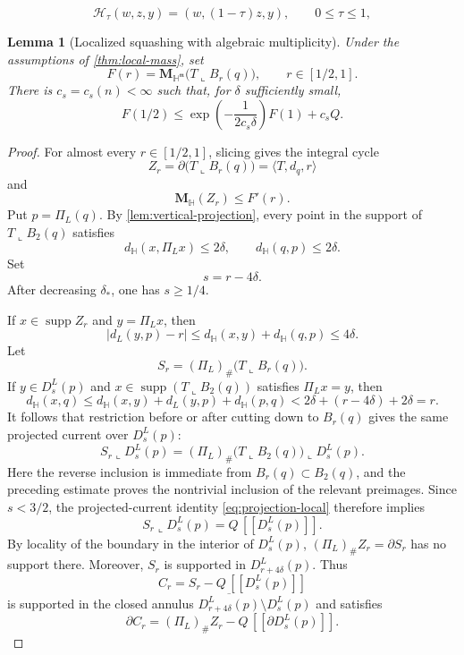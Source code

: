 \documentclass[10pt,a4paper]{amsart}
\newtheorem{lemma}{Lemma}
\newcommand{\Hyp}{\mathbb H}
\newcommand{\Mass}{\mathbf M}
\newcommand{\cur}[1]{\left[\!\left[#1\right]\!\right]}
\newcommand{\restr}{\mathbin{\llcorner}}
\newcommand{\supp}{\operatorname{supp}}
\begin{document}
\begin{equation}
 \mathcal H_\tau(w,z,y)=(w,(1-\tau)z,y),
 \qquad 0\le\tau\le1,
\end{equation}

\begin{lemma}[Localized squashing with algebraic multiplicity]
\label{lem:squashing}
Under the assumptions of \cref{thm:local-mass}, set
\[
 F(r)=\Mass_{\Hyp^{\mathfrak m}}\bigl(T\restr B_r(q)\bigr),
 \qquad r\in[1/2,1].
\]
There is $c_s=c_s(n)<\infty$ such that, for $\delta$ sufficiently small,
\begin{equation}\label{eq:squashing-integrated}
 F(1/2)
 \le\exp\!\left(-\frac{1}{2c_s\delta}\right)F(1)+c_sQ.
\end{equation}
\end{lemma}

\begin{proof}
For almost every $r\in[1/2,1]$, slicing gives the integral cycle
\[
 Z_r=\partial\bigl(T\restr B_r(q)\bigr)
     =\langle T,d_q,r\rangle
\]
and
\begin{equation}\label{eq:slice-derivative}
 \Mass_{\Hyp}(Z_r)\le F'(r).
\end{equation}
Put $p=\Pi_L(q)$.  By \cref{lem:vertical-projection}, every point in the
support of $T\restr B_2(q)$ satisfies
\begin{equation}\label{eq:two-delta-displacements}
 d_{\Hyp}(x,\Pi_Lx)\le2\delta,
 \qquad
 d_{\Hyp}(q,p)\le2\delta.
\end{equation}
Set
\[
 s=r-4\delta.
\]
After decreasing $\delta_*$, one has $s\ge1/4$.

If $x\in\supp Z_r$ and $y=\Pi_Lx$, then
\begin{equation}\label{eq:projected-annulus}
 \bigl|d_L(y,p)-r\bigr|
 \le d_{\Hyp}(x,y)+d_{\Hyp}(q,p)
 \le4\delta.
\end{equation}
Let
\[
 S_r=(\Pi_L)_\#\bigl(T\restr B_r(q)\bigr).
\]
If $y\in D_s^L(p)$ and
$x\in\supp(T\restr B_2(q))$ satisfies $\Pi_Lx=y$, then
\[
 d_{\Hyp}(x,q)
 \le d_{\Hyp}(x,y)+d_L(y,p)+d_{\Hyp}(p,q)
 <2\delta+(r-4\delta)+2\delta=r.
\]
It follows that restriction before or after cutting down to $B_r(q)$
gives the same projected current over $D_s^L(p)$:
\[
 S_r\restr D_s^L(p)
 = (\Pi_L)_\#\bigl(T\restr B_2(q)\bigr)\restr D_s^L(p).
\]
Here the reverse inclusion is immediate from $B_r(q)\subset B_2(q)$, and
the preceding estimate proves the nontrivial inclusion of the relevant
preimages.  Since $s<3/2$, the projected-current identity
\eqref{eq:projection-local} therefore implies
\begin{equation}\label{eq:Sr-inner}
 S_r\restr D_s^L(p)=Q\,\cur{D_s^L(p)}.
\end{equation}
By locality of the boundary in the interior of $D_s^L(p)$,
$(\Pi_L)_\#Z_r=\partial S_r$ has no support there.  Moreover, $S_r$ is
supported in $D_{r+4\delta}^L(p)$.  Thus
\[
 C_r=S_r-Q\,\cur{D_s^L(p)}
\]
is supported in the closed annulus
$\overline{D_{r+4\delta}^L(p)}\setminus D_s^L(p)$ and satisfies
\begin{equation}\label{eq:boundary-Cr}
 \partial C_r=(\Pi_L)_\#Z_r-Q\,\cur{\partial D_s^L(p)}.
\end{equation}


\end{proof}
\end{document}
